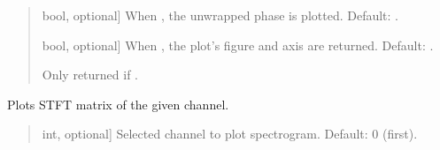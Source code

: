 \documentclass[letterpaper,10pt,english]{sphinxmanual}
\begin{document}
\begin{fulllineitems}
\begin{fulllineitems}
\begin{quote}
\begin{description}
\begin{description}
\sphinxlineitem{\sphinxstylestrong{unwrap}}{[}bool, optional{]}
\sphinxAtStartPar
When , the unwrapped phase is plotted. Default: .

\sphinxlineitem{\sphinxstylestrong{returns}}{[}bool, optional{]}
\sphinxAtStartPar
When , the plot’s figure and axis are returned.
Default: .

\end{description}

\begin{description}
\sphinxAtStartPar
Only returned if .

\end{description}

\end{description}\end{quote}

\end{fulllineitems}


\begin{fulllineitems}
\label{\detokenize{classes:dsptools.classes.signal_class.Signal.plot_spectrogram}}
\pysigstartsignatures
{}
\pysigstopsignatures
\sphinxAtStartPar
Plots STFT matrix of the given channel.
\begin{quote}\begin{description}
\begin{description}
\sphinxlineitem{\sphinxstylestrong{channel\_number}}{[}int, optional{]}
\sphinxAtStartPar
Selected channel to plot spectrogram. Default: 0 (first).


\end{description}
\end{description}
\end{quote}
\end{fulllineitems}
\end{fulllineitems}
\end{document}
